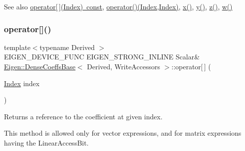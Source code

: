 \begin{DoxySeeAlso}{See also}
\mbox{\hyperlink{class_eigen_1_1_dense_coeffs_base_3_01_derived_00_01_read_only_accessors_01_4_ad26422dfa7b2bf859d4304663c36de10}{operator\mbox{[}$\,$\mbox{]}(\+Index) const}}, \mbox{\hyperlink{class_eigen_1_1_dense_coeffs_base_3_01_derived_00_01_write_accessors_01_4_ab0c40ee1944059a3e32a125cf794d547}{operator()(\+Index,\+Index)}}, \mbox{\hyperlink{class_eigen_1_1_dense_coeffs_base_3_01_derived_00_01_write_accessors_01_4_a2a9ca10b9ee750cefc5f914f215cba18}{x()}}, \mbox{\hyperlink{class_eigen_1_1_dense_coeffs_base_3_01_derived_00_01_write_accessors_01_4_ac04b8e2ab263c3901d72c5240ad017b5}{y()}}, \mbox{\hyperlink{class_eigen_1_1_dense_coeffs_base_3_01_derived_00_01_write_accessors_01_4_ad64b8fa3ee1cda9eb3df918eaf8b0396}{z()}}, \mbox{\hyperlink{class_eigen_1_1_dense_coeffs_base_3_01_derived_00_01_write_accessors_01_4_a225a129a5f2d8863068bd5629a6144a6}{w()}} 
\end{DoxySeeAlso}
\mbox{\label{class_eigen_1_1_dense_coeffs_base_3_01_derived_00_01_write_accessors_01_4_a38f5d78476b3db56db98853af750cf31}} 
\subsubsection{\texorpdfstring{operator[]()}{operator[]()}}
{\footnotesize\ttfamily template$<$typename Derived $>$ \\
E\+I\+G\+E\+N\+\_\+\+D\+E\+V\+I\+C\+E\+\_\+\+F\+U\+NC E\+I\+G\+E\+N\+\_\+\+S\+T\+R\+O\+N\+G\+\_\+\+I\+N\+L\+I\+NE Scalar\& \mbox{\hyperlink{class_eigen_1_1_dense_coeffs_base}{Eigen\+::\+Dense\+Coeffs\+Base}}$<$ Derived, Write\+Accessors $>$\+::operator\mbox{[}$\,$\mbox{]} (\begin{DoxyParamCaption}\item[{\mbox{\hyperlink{struct_eigen_1_1_eigen_base_a554f30542cc2316add4b1ea0a492ff02}{Index}}}]{index }\end{DoxyParamCaption})\hspace{0.3cm}{\ttfamily [inline]}}

\begin{DoxyReturn}{Returns}
a reference to the coefficient at given index.
\end{DoxyReturn}
This method is allowed only for vector expressions, and for matrix expressions having the Linear\+Access\+Bit.


